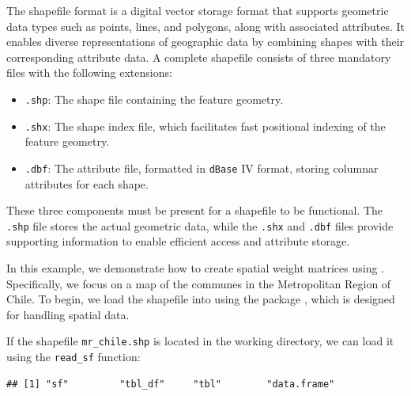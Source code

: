 The shapefile format is a digital vector storage format that supports geometric data types such as points, lines, and polygons, along with associated attributes. It enables diverse representations of geographic data by combining shapes with their corresponding attribute data. A complete shapefile consists of three mandatory files with the following extensions:
\begin{itemize}
  \item \texttt{.shp}: The shape file containing the feature geometry.
  \item \texttt{.shx}: The shape index file, which facilitates fast positional indexing of the feature geometry.
  \item \texttt{.dbf}: The attribute file, formatted in \texttt{dBase} IV format, storing columnar attributes for each shape.
\end{itemize}

These three components must be present for a shapefile to be functional. The \texttt{.shp} file stores the actual geometric data, while the \texttt{.shx} and \texttt{.dbf} files provide supporting information to enable efficient access and attribute storage.

In this example, we demonstrate how to create spatial weight matrices using . Specifically, we focus on a map of the communes in the Metropolitan Region of Chile. To begin, we load the shapefile into  using the  package \citep{pabesmasf}, which is designed for handling spatial data.

\begin{knitrout}
\color{fgcolor}\begin{kframe}
\begin{alltt}
\hldef{(}\hldef{)}
\end{alltt}
\end{kframe}
\end{knitrout}

If the shapefile \texttt{mr\_chile.shp} is located in the working directory, we can load it using the \texttt{read\_sf} function:
\begin{knitrout}
\color{fgcolor}\begin{kframe}
\begin{alltt}
 \hlkwb{<-} \hldef{(}\hldef{)}
\end{alltt}
\begin{verbatim}
## [1] "sf"         "tbl_df"     "tbl"        "data.frame"
\end{verbatim}
\end{kframe}
\end{knitrout}

